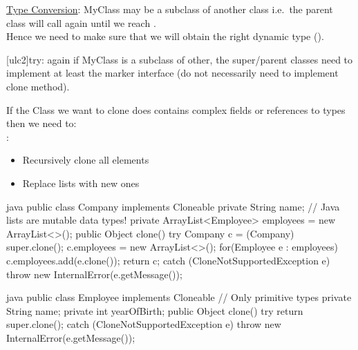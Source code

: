 \begin{notebox}[Notes]\nospacing
  \begin{itemizenosep}
      \item \ul{Type Conversion}: MyClass may be a subclass of another class
    i.e.\ the parent class will call again  until
    we reach .\\
    Hence we need to make sure that we will obtain the right dynamic type
    ().
      \item \ul[ulc2]{try}: again if MyClass is a subclass of other, the
      super/parent classes need to implement at least the 
      marker interface (do not necessarily need to implement clone method).
  \end{itemizenosep}
\end{notebox}
\begin{defnbox}\nospacing
  \begin{itemizenosep}
    \item If the Class we want to clone does contains complex fields or
    references to  types then we need to:\\
      :
    \begin{itemize}
        \item Recursively clone all elements
        \item Replace lists with new ones
    \end{itemize}
  \end{itemizenosep}
\end{defnbox}
\begin{codeboxNl}{java}
public class Company implements Cloneable {
  private String name;
  // Java lists are mutable data types!
  private ArrayList<Employee> employees = new ArrayList<>();
  public Object clone() {
    try {
      Company c = (Company) super.clone();
      c.employees = new ArrayList<>();
      for(Employee e : employees)     
        c.employees.add(e.clone());
      return c;
    } catch (CloneNotSupportedException e) {
      throw new InternalError(e.getMessage());
    }
  }     
}
\end{codeboxNl}
\begin{codeboxNl}{java}
public class Employee implements Cloneable {
  // Only primitive types
  private String name;
  private int yearOfBirth;
  public Object clone() {
    try {
      return super.clone();
    } catch (CloneNotSupportedException e) {
      throw new InternalError(e.getMessage());
    }
  }
}
\end{codeboxNl}
